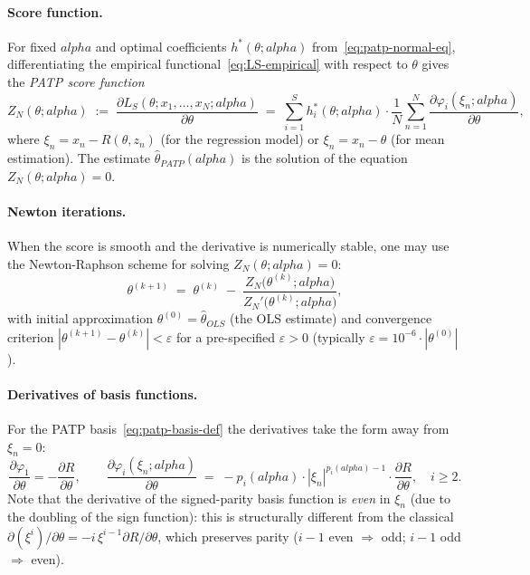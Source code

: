 \documentclass[11pt]{article}
\def\alpha{alpha}%
\def\vec#1{#1}%
\def\mathrm#1{#1}%
\theoremstyle{definition}
\newcommand{\PATP}{\mathrm{PATP}}
\begin{document}
\paragraph{Score function.}
For fixed $\alpha$ and optimal coefficients
$\vec h^{*}(\theta; \alpha)$ from~\eqref{eq:patp-normal-eq}, differentiating
the empirical functional~\eqref{eq:LS-empirical} with respect to $\theta$ gives
the \emph{PATP score function}
\begin{equation}\label{eq:patp-score}
  Z_N(\theta; \alpha)
  \;:=\; \frac{\partial L_S(\theta; x_1, \ldots, x_N; \alpha)}
              {\partial \theta}
  \;=\; \sum_{i=1}^{S} h_i^{*}(\theta; \alpha)
        \cdot \frac{1}{N} \sum_{n=1}^{N}
        \frac{\partial \varphi_i(\xi_n; \alpha)}{\partial \theta},
\end{equation}
where $\xi_n = x_n - R(\theta, z_n)$ (for the regression model) or
$\xi_n = x_n - \theta$ (for mean estimation). The estimate
$\hat\theta_{\PATP}(\alpha)$ is the solution of the equation
$Z_N(\theta; \alpha) = 0$.

\paragraph{Newton iterations.}
When the score is smooth and the derivative is numerically stable, one may
use the Newton-Raphson scheme for solving $Z_N(\theta; \alpha) = 0$:
\begin{equation}\label{eq:nr-iteration}
  \theta^{(k+1)}
  \;=\; \theta^{(k)} \;-\;
        \frac{Z_N\bigl(\theta^{(k)}; \alpha\bigr)}
             {Z_N'\bigl(\theta^{(k)}; \alpha\bigr)},
\end{equation}
with initial approximation $\theta^{(0)} = \hat\theta_{\mathrm{OLS}}$
(the OLS estimate) and convergence criterion $|\theta^{(k+1)} - \theta^{(k)}|
< \varepsilon$ for a pre-specified $\varepsilon > 0$
(typically $\varepsilon = 10^{-6} \cdot |\theta^{(0)}|$).

\paragraph{Derivatives of basis functions.}
For the PATP basis~\eqref{eq:patp-basis-def} the derivatives take the form
away from $\xi_n=0$:
\begin{equation}\label{eq:basis-derivatives}
  \frac{\partial \varphi_1}{\partial \theta} = -\frac{\partial R}{\partial \theta},
  \qquad
  \frac{\partial \varphi_i(\xi_n; \alpha)}{\partial \theta}
  \;=\; -p_i(\alpha) \cdot |\xi_n|^{p_i(\alpha) - 1}
        \cdot \frac{\partial R}{\partial \theta},
  \quad i \geq 2.
\end{equation}
Note that the derivative of the signed-parity basis function is \emph{even}
in $\xi_n$ (due to the doubling of the sign function): this is structurally
different from the classical $\partial(\xi^i)/\partial\theta = -i\,\xi^{i-1}
\partial R/\partial\theta$, which preserves parity ($i-1$ even $\Rightarrow$
odd; $i-1$ odd $\Rightarrow$ even).
\end{document}
